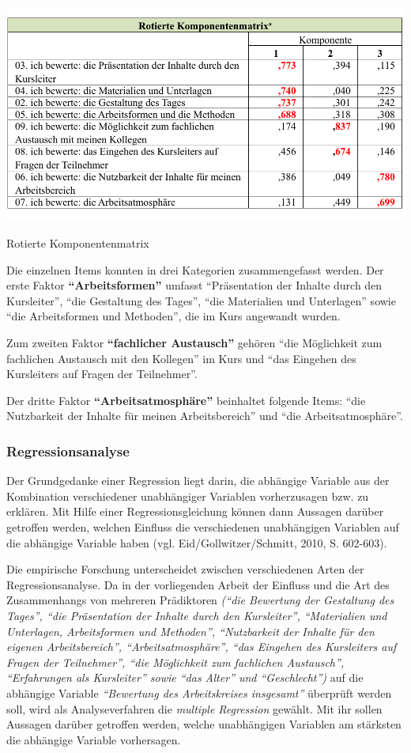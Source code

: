 \documentclass[12pt,a4paper]{article}
\begin{document}
\begin{table}[!ht]
\includegraphics[scale=0.84]{tab7.pdf}
\caption{Rotierte Komponentenmatrix}
\label{tab3}
\end{table}
\FloatBarrier

Die einzelnen Items konnten in drei Kategorien zusammengefasst werden. 	
Der erste Faktor \textbf{"`Arbeitsformen"'} umfasst "`Präsentation der Inhalte durch den Kursleiter"', "`die Gestaltung des Tages"', "`die Materialien und Unterlagen"' sowie "`die Arbeitsformen und Methoden"', die im Kurs angewandt wurden.

Zum zweiten Faktor \textbf{"`fachlicher Austausch"'} gehören "`die Möglichkeit zum fachlichen Austausch mit den Kollegen"' im Kurs und "`das Eingehen des Kursleiters auf Fragen der Teilnehmer"'.

Der dritte Faktor \textbf{"`Arbeitsatmosphäre"' }beinhaltet folgende Items: "`die Nutzbarkeit der Inhalte für meinen Arbeitsbereich"' und "`die Ar\-beits\-at\-mos\-phä\-re"'.

\subsubsection{Regressionsanalyse}

Der Grundgedanke einer Regression liegt darin, die abhängige Variable aus der Kombination verschiedener unabhängiger Variablen vorherzusagen bzw. zu erklären. Mit Hilfe einer Regressionsgleichung können dann Aussagen darüber getroffen werden, welchen Einfluss die verschiedenen unabhängigen Variablen auf die abhängige Variable haben (vgl. Eid/Gollwitzer/Schmitt, 2010, S. 602-603). 

Die empirische Forschung unterscheidet zwischen verschiedenen Arten der Regressionsanalyse. Da in der vorliegenden Arbeit der Einfluss und die Art des Zusammenhangs von mehreren Prädiktoren \textit{("`die Bewertung der Gestaltung des Tages"', "`die Präsentation der Inhalte durch den Kursleiter"', "`Materialien und Unterlagen, Arbeitsformen und Methoden"', "`Nutzbarkeit der Inhalte für den eigenen Arbeitsbereich"', "`Arbeitsatmosphäre"', "`das Eingehen des Kursleiters auf Fragen der Teilnehmer"', "`die Möglichkeit zum fachlichen Austausch"', "`Erfahrungen als Kursleiter"' sowie "`das Alter"' und "`Geschlecht"')} auf die abhängige Variable \textit{"`Bewertung des Arbeitskreises insgesamt"'} überprüft werden soll, wird als Analyseverfahren die \textit{multiple Regression} gewählt. Mit ihr sollen Aussagen darüber getroffen werden, welche unabhängigen Variablen am stärksten die abhängige Variable vorhersagen.
\end{document}
